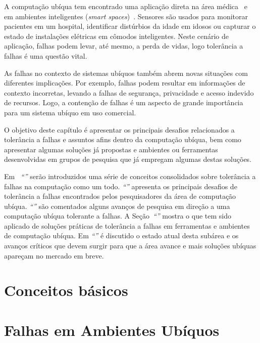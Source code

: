 \documentclass{SBCbookchapter}
\begin{document}
A computação ubíqua tem encontrado uma aplicação direta na área médica~\cite{Bang03} e em ambientes inteligentes (\emph{smart spaces})~\cite{Kidd99}. Sensores são usados para monitorar pacientes em um hospital, identificar distúrbios da idade em idosos ou capturar o estado de instalações elétricas em cômodos inteligentes. Neste cenário de aplicação, falhas podem levar, até mesmo, a perda de vidas, logo tolerância a falhas é uma questão vital.

As falhas no contexto de sistemas ubíquos também abrem novas situações com diferentes implicações. Por exemplo, falhas podem resultar em informações de contexto incorretas, levando a falhas de segurança, privacidade e acesso indevido de recursos. Logo, a contenção de falhas é um aspecto de grande importância para um sistema ubíquo em uso comercial.

O objetivo deste capítulo é apresentar os principais desafios relacionados a tolerância a falhas e assuntos afins dentro da computação ubíqua, bem como apresentar algumas soluções já propostas e ambientes ou ferramentas desenvolvidas em grupos de pesquisa que já empregam algumas destas soluções.

Em ~\emph{``''} serão introduzidos uma série de conceitos consolidados sobre tolerância a falhas na computação como um todo. \emph{``''} apresenta os principais desafios de tolerância a falhas encontrados pelos pesquisadores da área de computação ubíqua. \emph{``''} são comentados alguns avanços de pesquisa em direção a uma computação ubíqua tolerante a falhas. A Seção~\emph{``''} mostra o que tem sido aplicado de soluções práticas de tolerância a falhas em ferramentas e ambientes de computação ubíqua. Em \emph{``''} é discutido o estado atual desta subárea e os avanços críticos que devem surgir para que a área avance e mais soluções ubíquas apareçam no mercado em breve.


\section{Conceitos básicos}
\label{sec:falhas_ubicomp}


\section{Falhas em Ambientes Ubíquos}
\label{sec:falhas_ubicomp}

\end{document}
